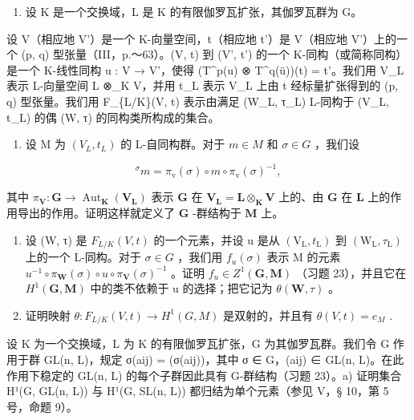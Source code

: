 \begin{enumerate}
\def\labelenumi{\arabic{enumi})}
\setcounter{enumi}{23}
\tightlist
\item
  设 K 是一个交换域，L 是 K 的有限伽罗瓦扩张，其伽罗瓦群为 G。
\end{enumerate}

设 V（相应地 V'）是一个 K-向量空间，t（相应地 t'）是 V（相应地 V'）上的一个 (p, q) 型张量（III，p.～63）。(V, t) 到 (V', t') 的一个 K-同构（或简称同构）是一个 K-线性同构 u : V → V'，使得 (T\^{}p(u) ⊗ T\^{}q(ü))(t) = t'。我们用 V\_L 表示 L-向量空间 L ⊗\_K V，并用 t\_L 表示 V\_L 上由 t 经标量扩张得到的 (p, q) 型张量。我们用 F\_\{L/K\}(V, t) 表示由满足 (W\_L, τ\_L) L-同构于 (V\_L, t\_L) 的偶 (W, τ) 的同构类所构成的集合。

\begin{enumerate}
\def\labelenumi{\alph{enumi})}
\tightlist
\item
  设 M 为 \((V_{L}, t_{L})\) 的 L-自同构群。对于 \(m \in M\) 和 \(\sigma \in G\) ，我们设
\end{enumerate}

\[
{ } ^ { \sigma } m = \pi _ { \mathrm{v} } ( \sigma ) \circ m \circ \pi _ { \mathrm{v} } ( \sigma ) ^ { - 1 } ,
\]

其中 \(\pi_{\mathbf{V}}: \mathbf{G} \to \operatorname{Aut}_{\mathbf{K}}(\mathbf{V}_{\mathbf{L}})\) 表示 \(\mathbf{G}\) 在 \(\mathbf{V}_{\mathbf{L}} = \mathbf{L} \otimes_{\mathbf{K}} \mathbf{V}\) 上的、由 \(\mathbf{G}\) 在 \(\mathbf{L}\) 上的作用导出的作用。证明这样就定义了 \(\mathbf{G}\) -群结构于 \(\mathbf{M}\) 上。

\begin{enumerate}
\def\labelenumi{\alph{enumi})}
\setcounter{enumi}{1}
\item
  设 (W, τ) 是 \(F_{L/K}(V, t)\) 的一个元素，并设 u 是从 \((\mathrm{V}_{\mathrm{L}}, t_{\mathrm{L}})\) 到 \((\mathrm{W}_{\mathrm{L}}, \tau_{\mathrm{L}})\) 上的一个 L-同构。对于 \(\sigma \in G\) ，我们用 \(f_{u}(\sigma)\) 表示 M 的元素 \(u^{-1} \circ \pi_{\mathbf{W}}(\sigma) \circ u \circ \pi_{\mathbf{V}}(\sigma)^{-1}\) 。证明 \(f_{u} \in Z^{1}(\mathbf{G}, \mathbf{M})\) （习题 23），并且它在 \(H^{1}(\mathbf{G}, \mathbf{M})\) 中的类不依赖于 u 的选择；把它记为 \(\theta(\mathbf{W}, \tau)\) 。
\item
  证明映射 \(\theta : F_{L/K}(V, t) \to H^1(G, M)\) 是双射的，并且有 \(\theta(V, t) = e_M\) .
\end{enumerate}

设 K 为一个交换域，L 为 K 的有限伽罗瓦扩张，G 为其伽罗瓦群。我们令 G 作用于群 GL(n, L)，规定 σ(aij) = (σ(aij))，其中 σ ∈ G，(aij) ∈ GL(n, L)。在此作用下稳定的 GL(n, L) 的每个子群因此具有 G-群结构（习题 23）。a) 证明集合 H¹(G, GL(n, L)) 与 H¹(G, SL(n, L)) 都归结为单个元素（参见 V，§ 10，第 5 号，命题 9）。

